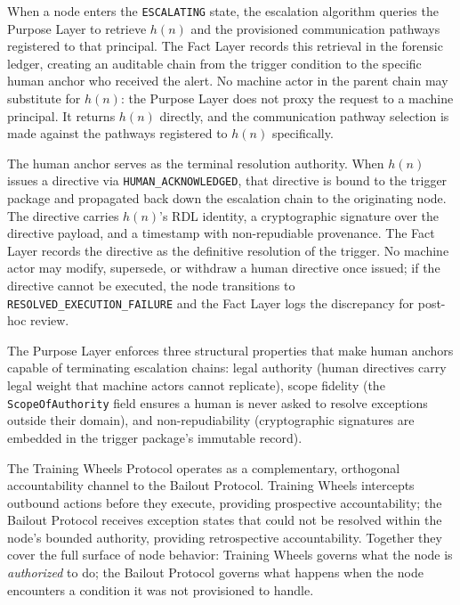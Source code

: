 When a node enters the \texttt{ESCALATING} state, the escalation algorithm queries
the Purpose Layer to retrieve $h(n)$ and the provisioned communication pathways
registered to that principal. The Fact Layer records this retrieval in the forensic
ledger, creating an auditable chain from the trigger condition to the specific human
anchor who received the alert. No machine actor in the parent chain may substitute
for $h(n)$: the Purpose Layer does not proxy the request to a machine principal. It
returns $h(n)$ directly, and the communication pathway selection is made against the
pathways registered to $h(n)$ specifically.

The human anchor serves as the terminal resolution authority. When $h(n)$ issues a
directive via \texttt{HUMAN\_ACKNOWLEDGED}, that directive is bound to the trigger
package and propagated back down the escalation chain to the originating node. The
directive carries $h(n)$'s RDL identity, a cryptographic signature over the directive
payload, and a timestamp with non-repudiable provenance. The Fact Layer records the
directive as the definitive resolution of the trigger. No machine actor may modify,
supersede, or withdraw a human directive once issued; if the directive cannot be
executed, the node transitions to \texttt{RESOLVED\_EXECUTION\_FAILURE} and the Fact
Layer logs the discrepancy for post-hoc review.

The Purpose Layer enforces three structural properties that make human anchors
capable of terminating escalation chains: legal authority (human directives carry
legal weight that machine actors cannot replicate), scope fidelity (the
\texttt{ScopeOfAuthority} field ensures a human is never asked to resolve exceptions
outside their domain), and non-repudiability (cryptographic signatures are embedded
in the trigger package's immutable record).

The Training Wheels Protocol operates as a complementary, orthogonal accountability
channel to the Bailout Protocol. Training Wheels intercepts outbound actions before
they execute, providing prospective accountability; the Bailout Protocol receives
exception states that could not be resolved within the node's bounded authority,
providing retrospective accountability. Together they cover the full surface of node
behavior: Training Wheels governs what the node is \emph{authorized} to do; the
Bailout Protocol governs what happens when the node encounters a condition it was
not provisioned to handle.

